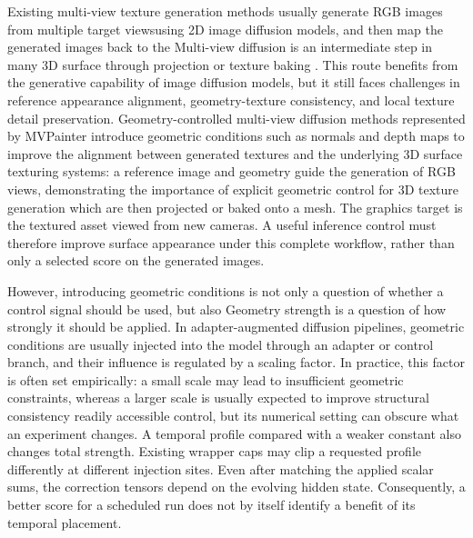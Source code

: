 \documentclass[times,twocolumn,final]{elsarticle}
\providecommand{\DIFadd}[1]{{\protect\color{blue} \sf #1}} %
\providecommand{\DIFdel}[1]{{\protect\color{red} \scriptsize #1}} %
\providecommand{\DIFaddbegin}{} %
\providecommand{\DIFaddend}{} %
\providecommand{\DIFdelbegin}{} %
\providecommand{\DIFdelend}{} %
\begin{document}
\DIFdel{Existing multi-view texture generation methods usually generate RGB images from multiple target viewsusing 2D image diffusion models, and then map the generated images back to the }\DIFdelend \DIFaddbegin \DIFadd{Multi-view diffusion is an intermediate step in many }\DIFaddend 3D \DIFdelbegin \DIFdel{surface through projection or texture baking \cite{chen2023text2tex,richardson2023texture,poole2023dreamfusion,chen2023fantasia3d}. This route benefits from the generative capability of image diffusion models, but it still faces challenges in reference appearance alignment, geometry-texture consistency, and local texture detail preservation. Geometry-controlled multi-view diffusion methods represented by MVPainter introduce geometric conditions such as normals and depth maps to improve the alignment between generated textures and the underlying 3D surface }\DIFdelend \DIFaddbegin \DIFadd{texturing systems: a reference image and geometry guide the generation of RGB views}\DIFaddend , \DIFdelbegin \DIFdel{demonstrating the importance of explicit geometric control for 3D texture generation \cite{shao2025mvpainter}}\DIFdelend \DIFaddbegin \DIFadd{which are then projected or baked onto a mesh. The graphics target is the textured asset viewed from new cameras. A useful inference control must therefore improve surface appearance under this complete workflow, rather than only a selected score on the generated images}\DIFaddend .

\DIFdelbegin \DIFdel{However, introducing geometric conditions is not only a question of whether a control signal should be used, but also }\DIFdelend \DIFaddbegin \DIFadd{Geometry strength is }\DIFaddend a \DIFdelbegin \DIFdel{question of how strongly it should be applied. In adapter-augmented diffusion pipelines, geometric conditions are usually injected into the model through an adapter or control branch, and their influence is regulated by a scaling factor. In practice, this factor is often set empirically: a small scale may lead to insufficient geometric constraints, whereas a larger scale is usually expected to improve structural consistency}\DIFdelend \DIFaddbegin \DIFadd{readily accessible control, but its numerical setting can obscure what an experiment changes. A temporal profile compared with a weaker constant also changes total strength. Existing wrapper caps may clip a requested profile differently at different injection sites. Even after matching the applied scalar sums, the correction tensors depend on the evolving hidden state. Consequently, a better score for a scheduled run does not by itself identify a benefit of its temporal placement}\DIFaddend .
\end{document}
